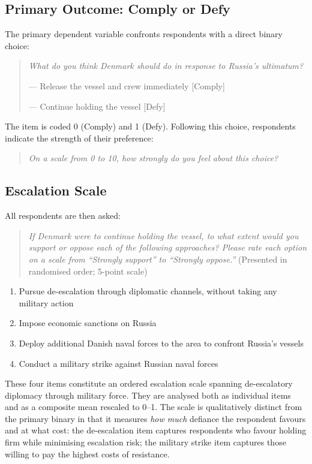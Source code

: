 \subsection{Primary Outcome: Comply or Defy}

The primary dependent variable confronts respondents with a direct binary choice:

\begin{quote}
\textit{What do you think Denmark should do in response to Russia's ultimatum?}

 --- Release the vessel and crew immediately \hfill [Comply]

 --- Continue holding the vessel \hfill [Defy]
\end{quote}

\noindent The item is coded 0 (Comply) and 1 (Defy). Following this choice, respondents indicate the strength of their preference:

\begin{quote}
\textit{On a scale from 0 to 10, how strongly do you feel about this choice?}
\end{quote}

\subsection{Escalation Scale}

All respondents are then asked:

\begin{quote}
\textit{If Denmark were to continue holding the vessel, to what extent would you support or oppose each of the following approaches? Please rate each option on a scale from ``Strongly support'' to ``Strongly oppose.''} (Presented in randomised order; 5-point scale)
\end{quote}

\begin{enumerate}
    \item Pursue de-escalation through diplomatic channels, without taking any military action
    \item Impose economic sanctions on Russia
    \item Deploy additional Danish naval forces to the area to confront Russia's vessels
    \item Conduct a military strike against Russian naval forces
\end{enumerate}

These four items constitute an ordered escalation scale spanning de-escalatory diplomacy through military force. They are analysed both as individual items and as a composite mean rescaled to 0--1. The scale is qualitatively distinct from the primary binary in that it measures \textit{how much} defiance the respondent favours and at what cost: the de-escalation item captures respondents who favour holding firm while minimising escalation risk; the military strike item captures those willing to pay the highest costs of resistance.

